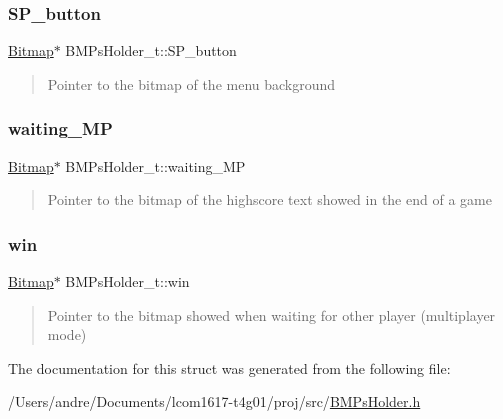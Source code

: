 \hypertarget{struct_b_m_ps_holder__t_a7f5933cadc7f54074b09ce901893a609}{}\label{struct_b_m_ps_holder__t_a7f5933cadc7f54074b09ce901893a609} 
\subsubsection{\texorpdfstring{S\+P\+\_\+button}{SP\_button}}
{\footnotesize\ttfamily \hyperlink{struct_bitmap}{Bitmap}$\ast$ B\+M\+Ps\+Holder\+\_\+t\+::\+S\+P\+\_\+button}



\begin{quote}
Pointer to the bitmap of the menu background \end{quote}


\hypertarget{struct_b_m_ps_holder__t_ac67fdbe89e0f655e44d4445901fb5692}{}\label{struct_b_m_ps_holder__t_ac67fdbe89e0f655e44d4445901fb5692} 
\subsubsection{\texorpdfstring{waiting\+\_\+\+MP}{waiting\_MP}}
{\footnotesize\ttfamily \hyperlink{struct_bitmap}{Bitmap}$\ast$ B\+M\+Ps\+Holder\+\_\+t\+::waiting\+\_\+\+MP}



\begin{quote}
Pointer to the bitmap of the highscore text showed in the end of a game \end{quote}


\hypertarget{struct_b_m_ps_holder__t_a4eee83abbb2345c4be67f06fac361d94}{}\label{struct_b_m_ps_holder__t_a4eee83abbb2345c4be67f06fac361d94} 
\subsubsection{\texorpdfstring{win}{win}}
{\footnotesize\ttfamily \hyperlink{struct_bitmap}{Bitmap}$\ast$ B\+M\+Ps\+Holder\+\_\+t\+::win}



\begin{quote}
Pointer to the bitmap showed when waiting for other player (multiplayer mode) \end{quote}




The documentation for this struct was generated from the following file\+:\begin{DoxyCompactItemize}
\item 
/\+Users/andre/\+Documents/lcom1617-\/t4g01/proj/src/\hyperlink{_b_m_ps_holder_8h}{B\+M\+Ps\+Holder.\+h}\end{DoxyCompactItemize}
